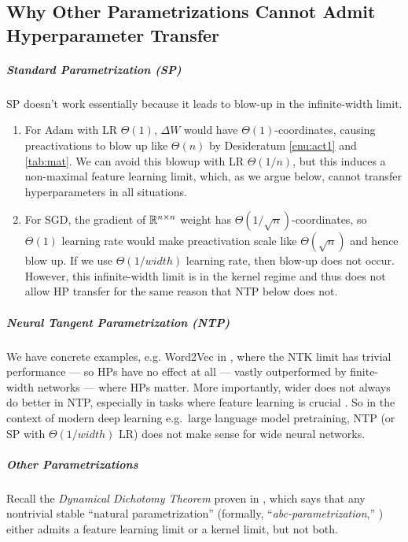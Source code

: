 \documentclass{article}
\theoremstyle{definition}
\begin{document}
    \subsection{Why Other Parametrizations Cannot Admit Hyperparameter Transfer}
    \label{sec:otherparamdontwork}
    
    
    \subparagraph*{Standard Parametrization (SP)}
    
    SP doesn't work essentially because it leads to blow-up in the infinite-width limit.
    \begin{enumerate}
    \item For Adam with LR $\Theta(1)$, $\Delta W$ would have $\Theta(1)$-coordinates, causing preactivations to blow up like $\Theta(n)$ by Desideratum \ref{enu:act1} and \cref{tab:mat}.
    We can avoid this blowup with LR $\Theta(1/n)$, but this induces a non-maximal feature learning limit, which, as we argue below, cannot transfer hyperparameters in all situations.
    \item For SGD, the gradient of $\mathbb{R}^{n\times n}$ weight has $\Theta(1/\sqrt{n})$-coordinates, so $\Theta(1)$ learning rate would make preactivation scale like $\Theta(\sqrt{n})$ and hence blow up.
    If we use $\Theta(1/width)$ learning rate, then blow-up does not occur.
    However, this infinite-width limit is in the kernel regime \citep{TP4} and thus does not allow HP transfer for the same reason that NTP below does not.
    
    \end{enumerate}
    
    
    \subparagraph*{Neural Tangent Parametrization (NTP)}
    
    We have concrete examples, e.g. Word2Vec in \citep{TP4}, where the NTK limit has trivial performance --- so HPs have no effect at all --- vastly outperformed by finite-width networks --- where HPs matter. More importantly, wider does not always do better in NTP, especially in tasks where feature learning is crucial \citep{TP4,yang2022efficient}.
    So in the context of modern deep learning e.g.\ large language model pretraining, NTP (or SP with $\Theta(1/width)$ LR) does not make sense for wide neural networks.
    
    \subparagraph*{Other Parametrizations}
    
    Recall the \emph{Dynamical Dichotomy Theorem} proven in \cite{TP4}, which says that any nontrivial stable ``natural parametrization'' (formally, ``\emph{abc-parametrization},'' \citep{TP4}) either admits a feature learning limit or a kernel limit, but not both.
    
\end{document}
